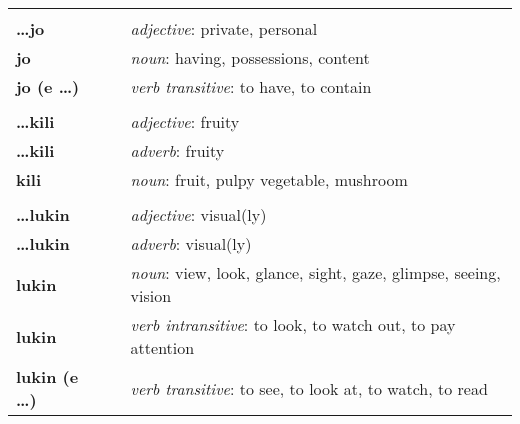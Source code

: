 \begin{supertabular}{p{2,5cm}|ll}
                              &  &                                                                                         \\ %
    \textbf{\dots jo}         &  & \textit{adjective}: private, personal                                                   \\ %
    \textbf{jo}               &  & \textit{noun}: having, possessions, content                                             \\ %
    \textbf{jo (e \dots)}     &  & \textit{verb transitive}: to have, to contain                                           \\ %
                              &  &                                                                                         \\ %
    \textbf{\dots kili}       &  & \textit{adjective}: fruity                                                              \\ %
    \textbf{\dots kili}       &  & \textit{adverb}: fruity                                                                 \\ %
    \textbf{kili}             &  & \textit{noun}: fruit, pulpy vegetable, mushroom                                         \\ %
                              &  &                                                                                         \\ %
    \textbf{\dots lukin}      &  & \textit{adjective}: visual(ly)                                                          \\ %
    \textbf{\dots lukin}      &  & \textit{adverb}: visual(ly)                                                             \\ %
    \textbf{lukin}            &  & \textit{noun}: view, look, glance, sight, gaze, glimpse, seeing, vision                 \\ %
    \textbf{lukin}            &  & \textit{verb intransitive}: to look, to watch out, to pay attention                     \\ %
    \textbf{lukin (e \dots)}  &  & \textit{verb transitive}: to see, to look at, to watch, to read                         \\ %

\end{supertabular}
